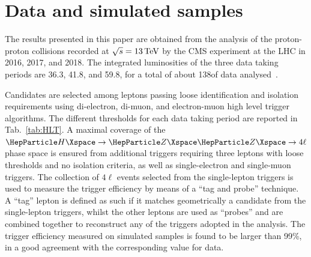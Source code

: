 


\section{Data and simulated samples}
\label{sec:samples}
The results presented in this paper are obtained from the analysis of the proton-proton collisions recorded at $\sqrt{s}=13\,\text{Te\hspace{-.08em}V}$ by the CMS experiment at the LHC in 2016, 2017, and 2018. The integrated luminosities of the three data taking periods are 36.3, 41.8, and 59.8\fbinv, for a total of about 138\fbinv of data analysed~\cite{CMS-PAS-LUM-17-001,CMS-PAS-LUM-17-004,CMS-PAS-LUM-18-002}.

Candidates are selected among leptons passing loose identification and isolation requirements using di-electron, di-muon, and electron-muon high level trigger algorithms. The different \pt thresholds for each data taking period are reported in Tab.~\ref{tab:HLT}. A maximal coverage of the $\HZZfl$ phase space is ensured from additional triggers requiring three leptons with loose \pt thresholds and no isolation criteria, as well as single-electron and single-muon triggers.
The collection of $4\ell$ events selected from the single-lepton triggers is used to measure the trigger efficiency by means of a ``tag and probe'' technique. A ``tag'' lepton is defined as such if it matches geometrically a candidate from the single-lepton triggers, whilst the other leptons are used as ``probes'' and are combined together to reconstruct any of the triggers adopted in the analysis. The trigger efficiency measured on simulated samples is found to be larger than 99\%, in a good agreement with the corresponding value for data.

